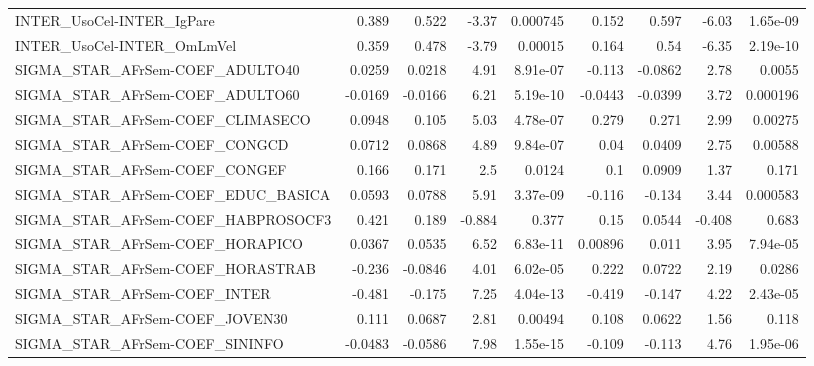 \begin{tabular}{lrrrrrrrr}
INTER\_UsoCel-INTER\_IgPare             &       0.389 &        0.522 &   -3.37 & 0.000745 &      0.152 &       0.597 &        -6.03 &      1.65e-09 \\
INTER\_UsoCel-INTER\_OmLmVel            &       0.359 &        0.478 &   -3.79 &  0.00015 &      0.164 &        0.54 &        -6.35 &      2.19e-10 \\
SIGMA\_STAR\_AFrSem-COEF\_ADULTO40       &      0.0259 &       0.0218 &    4.91 & 8.91e-07 &     -0.113 &     -0.0862 &         2.78 &        0.0055 \\
SIGMA\_STAR\_AFrSem-COEF\_ADULTO60       &     -0.0169 &      -0.0166 &    6.21 & 5.19e-10 &    -0.0443 &     -0.0399 &         3.72 &      0.000196 \\
SIGMA\_STAR\_AFrSem-COEF\_CLIMASECO      &      0.0948 &        0.105 &    5.03 & 4.78e-07 &      0.279 &       0.271 &         2.99 &       0.00275 \\
SIGMA\_STAR\_AFrSem-COEF\_CONGCD         &      0.0712 &       0.0868 &    4.89 & 9.84e-07 &       0.04 &      0.0409 &         2.75 &       0.00588 \\
SIGMA\_STAR\_AFrSem-COEF\_CONGEF         &       0.166 &        0.171 &     2.5 &   0.0124 &        0.1 &      0.0909 &         1.37 &         0.171 \\
SIGMA\_STAR\_AFrSem-COEF\_EDUC\_BASICA    &      0.0593 &       0.0788 &    5.91 & 3.37e-09 &     -0.116 &      -0.134 &         3.44 &      0.000583 \\
SIGMA\_STAR\_AFrSem-COEF\_HABPROSOCF3    &       0.421 &        0.189 &  -0.884 &    0.377 &       0.15 &      0.0544 &       -0.408 &         0.683 \\
SIGMA\_STAR\_AFrSem-COEF\_HORAPICO       &      0.0367 &       0.0535 &    6.52 & 6.83e-11 &    0.00896 &       0.011 &         3.95 &      7.94e-05 \\
SIGMA\_STAR\_AFrSem-COEF\_HORASTRAB      &      -0.236 &      -0.0846 &    4.01 & 6.02e-05 &      0.222 &      0.0722 &         2.19 &        0.0286 \\
SIGMA\_STAR\_AFrSem-COEF\_INTER          &      -0.481 &       -0.175 &    7.25 & 4.04e-13 &     -0.419 &      -0.147 &         4.22 &      2.43e-05 \\
SIGMA\_STAR\_AFrSem-COEF\_JOVEN30        &       0.111 &       0.0687 &    2.81 &  0.00494 &      0.108 &      0.0622 &         1.56 &         0.118 \\
SIGMA\_STAR\_AFrSem-COEF\_SININFO        &     -0.0483 &      -0.0586 &    7.98 & 1.55e-15 &     -0.109 &      -0.113 &         4.76 &      1.95e-06 \\

\end{tabular}
